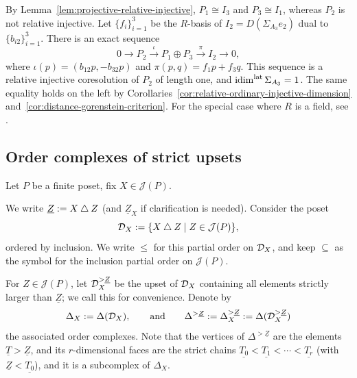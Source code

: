 \documentclass[a4paper,leqno]{amsart}
\begin{document}
\begin{eg}
\begin{enumerate}
By Lemma~\ref{lem:projective-relative-injective}, $P_1\cong I_3$ and $P_3\cong I_1$, whereas $P_2$ is not relative injective. Let $\{f_i\}_{i=1}^3$ be the $R$-basis of $I_2=D(\Sigma_{A_3}e_2)$ dual to $\{b_{i2}\}_{i=1}^3$. There is an exact sequence
\[
0\longrightarrow P_2
\xrightarrow{\ \iota\ }P_1\oplus P_3
\xrightarrow{\ \pi\ }I_2\longrightarrow0,
\]
where $\iota(p)=(b_{12}p,-b_{32}p)$ and $\pi(p,q)=f_1p+f_3q$. This sequence is a relative injective coresolution of $P_2$ of length one, and $\operatorname{idim}^{\operatorname{lat}}\Sigma_{A_3}=1$. The same equality holds on the left by Corollaries~\ref{cor:relative-ordinary-injective-dimension} and~\ref{cor:distance-gorenstein-criterion}.
For the special case where $R$ is a field, see \cite[Proposition~7.6]{CX26}.
\end{enumerate}
\end{eg}


\subsection{Order complexes of strict upsets}
\label{subsec:strict-upsets}

Let $P$ be a finite poset, fix $X\in\mathcal J(P)$.

We write $\underline{Z}:=X\mathbin{\triangle} Z$ (and $\underline{Z}_X$ if clarification is needed). Consider the poset
\[\mathcal D_X := \{X\mathbin{\triangle} Z \mid Z\in\mathcal J(P)\},\] 
ordered by inclusion.  We write $\le$ for this partial order on $\mathcal D_X$, and keep $\subseteq$ as the symbol for the inclusion partial order on $\mathcal{J}(P)$.

For $Z\in\mathcal J(P)$, let $\mathcal D_X^{>\underline{Z}}$ be the upset of $\mathcal D_X$ containing all elements strictly larger than $\underline{Z}$; we call this  for convenience. Denote by
\[
\Delta_X:=\Delta(\mathcal D_X), \qquad \text{and} \qquad \Delta^{>\underline{Z}}:=\Delta_X^{>\underline{Z}}:=\Delta(\mathcal D_X^{>\underline{Z}})
\]
the associated order complexes.  Note that the vertices of $\Delta^{>\underline{Z}}$ are the elements $\underline{T}>\underline{Z}$, and its $r$-dimensional faces are the strict chains $\underline{T_0}<\underline{T_1}<\cdots<\underline{T_r}$ (with $\underline{Z}<\underline{T_0}$), and it is a subcomplex of $\Delta_X$.
\end{document}
